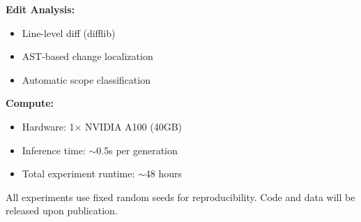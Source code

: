 \textbf{Edit Analysis:}
\begin{itemize}
\item Line-level diff (difflib)
\item AST-based change localization
\item Automatic scope classification
\end{itemize}

\textbf{Compute:}
\begin{itemize}
\item Hardware: 1$\times$ NVIDIA A100 (40GB)
\item Inference time: $\sim$0.5s per generation
\item Total experiment runtime: $\sim$48 hours
\end{itemize}

All experiments use fixed random seeds for reproducibility. Code and data will be released upon publication.
